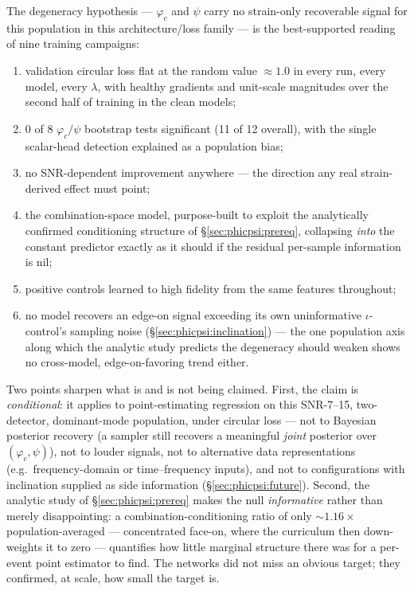 The degeneracy hypothesis --- $\varphi_c$ and $\psi$ carry no strain-only recoverable signal for this population in this architecture/loss family --- is the best-supported reading of nine training campaigns:
\begin{enumerate}
\item validation circular loss flat at the random value $\approx 1.0$ in every run, every model, every $\lambda$, with healthy gradients and unit-scale magnitudes over the second half of training in the clean models;
\item 0 of 8 $\varphi_c/\psi$ bootstrap tests significant (11 of 12 overall), with the single scalar-head detection explained as a population bias;
\item no SNR-dependent improvement anywhere --- the direction any real strain-derived effect must point;
\item the combination-space model, purpose-built to exploit the analytically confirmed conditioning structure of \S\ref{sec:phicpsi:prereq}, collapsing \emph{into} the constant predictor exactly as it should if the residual per-sample information is nil;
\item positive controls learned to high fidelity from the same features throughout;
\item no model recovers an edge-on signal exceeding its own uninformative $\iota$-control's sampling noise (\S\ref{sec:phicpsi:inclination}) --- the one population axis along which the analytic study predicts the degeneracy should weaken shows no cross-model, edge-on-favoring trend either.
\end{enumerate}

Two points sharpen what is and is not being claimed.
First, the claim is \emph{conditional}: it applies to point-estimating regression on this SNR-7--15, two-detector, dominant-mode population, under circular loss --- not to Bayesian posterior recovery (a sampler still recovers a meaningful \emph{joint} posterior over $(\varphi_c, \psi)$), not to louder signals, not to alternative data representations (e.g.\ frequency-domain or time--frequency inputs), and not to configurations with inclination supplied as side information (\S\ref{sec:phicpsi:future}).
Second, the analytic study of \S\ref{sec:phicpsi:prereq} makes the null \emph{informative} rather than merely disappointing: a combination-conditioning ratio of only ${\sim}1.16\times$ population-averaged --- concentrated face-on, where the curriculum then down-weights it to zero --- quantifies how little marginal structure there was for a per-event point estimator to find.
The networks did not miss an obvious target; they confirmed, at scale, how small the target is.

